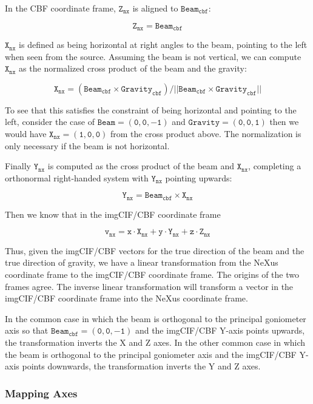 \documentclass[11pt]{article}
\begin{document}
{In the CBF coordinate frame, $\mathtt{Z_{nx}}$ is aligned to $\mathtt{Beam_{cbf}}$:

\[ 
\mathtt{Z_{nx} = Beam_{cbf}}
\]

$\mathtt{X_{nx}}$ is defined as being horizontal at right angles to the beam, pointing to the left when 
seen from the source.  Assuming the beam is not vertical, we can compute $\mathtt{X_{nx}}$ as 
the normalized cross product of the  beam and the gravity:

\[
\mathtt{X_{nx} = (Beam_{cbf} \times Gravity_{cbf}) / || Beam_{cbf} \times Gravity_{cbf}||}
\]

To see that this satisfies the constraint of being horizontal and pointing to the left, consider the
case of $\mathtt{Beam = \left( 0, 0, -1 \right)}$ and $\mathtt{Gravity = \left( 0, 0, 1 \right)}$ then we would
have $\mathtt{X_{nx} = \left( 1, 0, 0 \right)}$ from the cross product above.  The normalization
is only necessary if the beam is not horizontal.

Finally $\mathtt{Y_{nx}}$ is computed as the cross product of the beam and $\mathtt{X_{nx}}$, completing
a orthonormal right-handed system with $\mathtt{Y_{nx}}$ pointing upwards:


\[
\mathtt{Y_{nx} = Beam_{cbf} \times X_{nx}}
\]


Then we know that in the imgCIF/CBF coordinate frame 

\[
  \mathtt{v_{nx} = x \cdot X_{nx} + y \cdot Y_{nx} + z \cdot Z_{nx}}
\]

Thus, given the imgCIF/CBF vectors for the true direction of the beam and the true direction of
gravity, we have a linear transformation from the NeXus coordinate frame to the imgCIF/CBF
coordinate frame.   The origins of the two frames agree.   The inverse linear transformation will
transform a vector in the imgCIF/CBF coordinate frame into the NeXus coordinate frame.

In the common case in which the beam is orthogonal to the principal goniometer axis so
that $\mathtt{Beam_{cbf} = \left( 0, 0, -1 \right)}$ and the imgCIF/CBF Y-axis points upwards, the transformation
inverts the X and Z axes.  In the other common case in which the beam is orthogonal to the 
principal goniometer axis and the imgCIF/CBF Y-axis points downwards, the transformation
inverts the Y and Z axes.      
                                          
  
\subsubsection{Mapping Axes}

}
\end{document}
